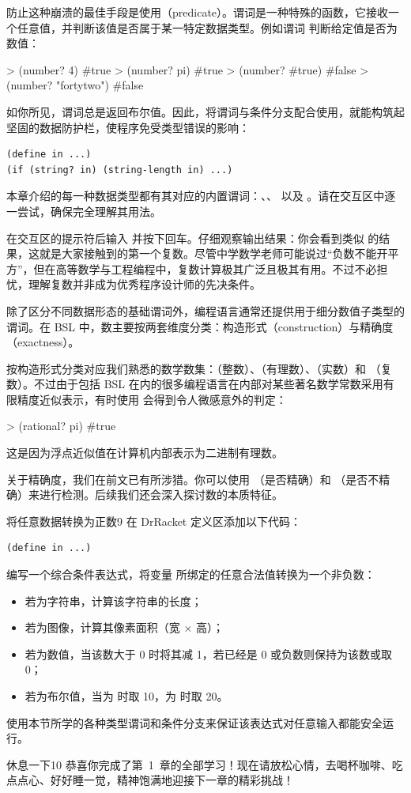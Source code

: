 防止这种崩溃的最佳手段是使用（predicate）。谓词是一种特殊的函数，它接收一个任意值，并判断该值是否属于某一特定数据类型。例如谓词  判断给定值是否为数值：
\begin{replbox}
> (number? 4)
#true
> (number? pi)
#true
> (number? #true)
#false
> (number? "fortytwo")
#false
\end{replbox}

如你所见，谓词总是返回布尔值。因此，将谓词与条件分支配合使用，就能构筑起坚固的数据防护栏，使程序免受类型错误的影响：
\begin{lstlisting}[language=BSL]
(define in ...)
(if (string? in) (string-length in) ...)
\end{lstlisting}

本章介绍的每一种数据类型都有其对应的内置谓词：、、 以及 。请在交互区中逐一尝试，确保完全理解其用法。

\begin{notebox}[有趣的复数探秘]
在交互区的提示符后输入  并按下回车。仔细观察输出结果：你会看到类似  的结果，这就是大家接触到的第一个复数。尽管中学数学老师可能说过“负数不能开平方”，但在高等数学与工程编程中，复数计算极其广泛且极其有用。不过不必担忧，理解复数并非成为优秀程序设计师的先决条件。
\end{notebox}

除了区分不同数据形态的基础谓词外，编程语言通常还提供用于细分数值子类型的谓词。在 BSL 中，数主要按两套维度分类：构造形式（construction）与精确度（exactness）。

按构造形式分类对应我们熟悉的数学数集：（整数）、（有理数）、（实数）和 （复数）。不过由于包括 BSL 在内的很多编程语言在内部对某些著名数学常数采用有限精度近似表示，有时使用  会得到令人微感意外的判定：
\begin{replbox}
> (rational? pi)
#true
\end{replbox}
这是因为浮点近似值在计算机内部表示为二进制有理数。

关于精确度，我们在前文已有所涉猎。你可以使用 （是否精确）和 （是否不精确）来进行检测。后续我们还会深入探讨数的本质特征。

\begin{exercise}{将任意数据转换为正数}{9}
在 DrRacket 定义区添加以下代码：
\begin{lstlisting}[language=BSL]
(define in ...)
\end{lstlisting}

编写一个综合条件表达式，将变量  所绑定的任意合法值转换为一个非负数：
\begin{itemize}
  \item 若为字符串，计算该字符串的长度；
  \item 若为图像，计算其像素面积（宽 $\times$ 高）；
  \item 若为数值，当该数大于 0 时将其减 1，若已经是 0 或负数则保持为该数或取 0；
  \item 若为布尔值，当为  时取 10，为  时取 20。
\end{itemize}
使用本节所学的各种类型谓词和条件分支来保证该表达式对任意输入都能安全运行。
\end{exercise}

\begin{exercise}{休息一下}{10}
恭喜你完成了第~1~章的全部学习！现在请放松心情，去喝杯咖啡、吃点点心、好好睡一觉，精神饱满地迎接下一章的精彩挑战！
\end{exercise}
